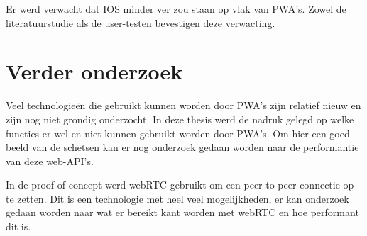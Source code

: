 	Er werd verwacht dat IOS minder ver zou staan op vlak van PWA's. Zowel de literatuurstudie als de user-testen bevestigen deze verwacting.
	

\section{Verder onderzoek}
	Veel technologieën die gebruikt kunnen worden door PWA's zijn relatief nieuw en zijn nog niet grondig onderzocht.
	In deze thesis werd de nadruk gelegd op welke functies er wel en niet kunnen gebruikt worden door PWA's. Om hier een goed beeld van de schetsen kan er nog onderzoek gedaan worden naar de performantie van deze web-API's.
	
	In de proof-of-concept werd webRTC gebruikt om een peer-to-peer connectie op te zetten. Dit is een technologie met heel veel mogelijkheden, er kan onderzoek gedaan worden naar wat er bereikt kant worden met webRTC en hoe performant dit is.
